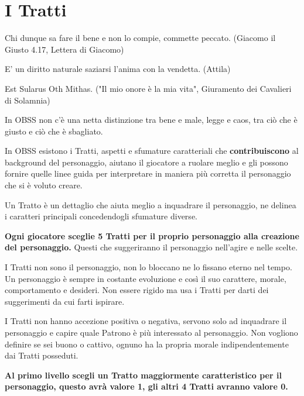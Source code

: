 \section{I Tratti}\hypertarget{tratti}{}\label{tratti}

\begin{enfasi}{Chi dunque sa fare il bene e non lo compie, commette peccato. (Giacomo il Giusto 4.17, Lettera di Giacomo)
\smallskip

E' un diritto naturale saziarsi l'anima con la vendetta. (Attila)
\smallskip

Est Sularus Oth Mithas. ("Il mio onore è la mia vita", Giuramento dei Cavalieri di Solamnia)
}\end{enfasi}

\begin{multicols}{2}

In OBSS non c'è una netta distinzione tra bene e male, legge e caos, tra ciò che è giusto e ciò che è sbagliato.

In OBSS esistono i Tratti, aspetti e sfumature caratteriali che \textbf{contribuiscono} al background del personaggio, aiutano il giocatore a ruolare meglio e gli possono fornire quelle linee guida per interpretare in maniera più corretta il personaggio che si è voluto creare.

Un Tratto è un dettaglio che aiuta meglio a inquadrare il personaggio, ne delinea i caratteri principali concedendogli sfumature diverse.

\textbf{Ogni giocatore sceglie 5 Tratti per il proprio personaggio alla creazione del personaggio.} Questi che suggeriranno il personaggio nell'agire e nelle scelte.

\begin{giocatore}
I Tratti non sono il personaggio, non lo bloccano ne lo fissano eterno nel tempo. Un personaggio è sempre in costante evoluzione e così il suo carattere, morale, comportamento e desideri. Non essere rigido ma usa i Tratti per darti dei suggerimenti da cui farti ispirare.
\end{giocatore}

I Tratti non hanno accezione positiva o negativa, servono solo ad inquadrare il personaggio e capire quale Patrono è più interessato al personaggio. Non vogliono definire se sei buono o cattivo, ognuno ha la propria morale indipendentemente dai Tratti posseduti.

\textbf{Al primo livello scegli un Tratto maggiormente caratteristico per il personaggio, questo avrà valore 1, gli altri 4 Tratti avranno valore 0.}


\end{multicols}
